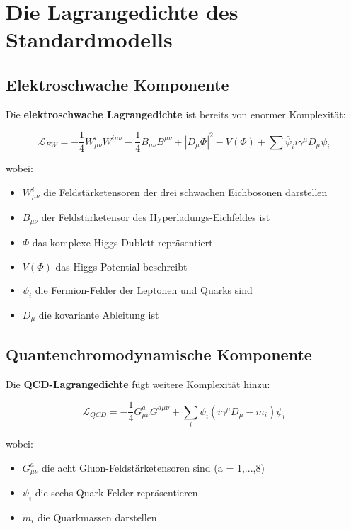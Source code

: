\documentclass[12pt,a4paper]{report}
\begin{document}
	\section{Die Lagrangedichte des Standardmodells}
	
	\subsection{Elektroschwache Komponente}
	
	Die \textbf{elektroschwache Lagrangedichte} ist bereits von enormer Komplexität:
	
	\begin{equation}
		\mathcal{L}_{EW} = -\frac{1}{4} W_{\mu\nu}^i W^{i\mu\nu} - \frac{1}{4} B_{\mu\nu} B^{\mu\nu} + |D_\mu\Phi|^2 - V(\Phi) + \sum \bar{\psi}_i i\gamma^\mu D_\mu \psi_i
	\end{equation}
	
	wobei:
	\begin{itemize}
		\item $W_{\mu\nu}^i$ die Feldstärketensoren der drei schwachen Eichbosonen darstellen
		\item $B_{\mu\nu}$ der Feldstärketensor des Hyperladungs-Eichfeldes ist
		\item $\Phi$ das komplexe Higgs-Dublett repräsentiert
		\item $V(\Phi)$ das Higgs-Potential beschreibt
		\item $\psi_i$ die Fermion-Felder der Leptonen und Quarks sind
		\item $D_\mu$ die kovariante Ableitung ist
	\end{itemize}
	
	\subsection{Quantenchromodynamische Komponente}
	
	Die \textbf{QCD-Lagrangedichte} fügt weitere Komplexität hinzu:
	
	\begin{equation}
		\mathcal{L}_{QCD} = -\frac{1}{4} G_{\mu\nu}^a G^{a\mu\nu} + \sum_i \bar{\psi}_i(i\gamma^\mu D_\mu - m_i)\psi_i
	\end{equation}
	
	wobei:
	\begin{itemize}
		\item $G_{\mu\nu}^a$ die acht Gluon-Feldstärketensoren sind (a = 1,...,8)
		\item $\psi_i$ die sechs Quark-Felder repräsentieren
		\item $m_i$ die Quarkmassen darstellen
	\end{itemize}
	
\end{document}
